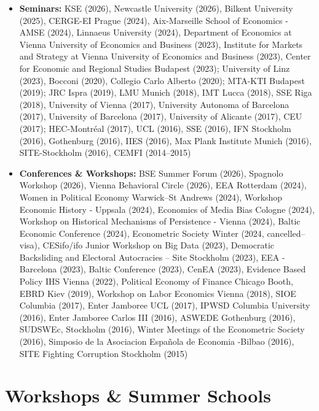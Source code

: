\documentclass[10pt, a4paper]{article}
\begin{document}
\begin{itemize}
\item \textbf{Seminars:} KSE (2026), Newcastle University (2026), Bilkent  University  (2025), CERGE-EI Prague (2024), Aix-Marseille School of Economics - AMSE (2024), Linnaeus University (2024), Department of Economics at Vienna University of Economics and Business  (2023), Institute
for Markets and Strategy at Vienna University of Economics and Business  (2023), Center
for Economic and Regional Studies Budapest  (2023); University of Linz (2023), Bocconi (2020), Collegio Carlo Alberto (2020); MTA-KTI Budapest (2019); JRC Ispra (2019), LMU Munich (2018), IMT Lucca (2018), SSE Riga (2018), University of Vienna (2017), University Autonoma of Barcelona (2017), University of Barcelona (2017),  University of Alicante (2017), CEU (2017); HEC-Montr\'eal (2017), UCL (2016),  SSE (2016),  IFN Stockholm (2016),  Gothenburg (2016),  IIES (2016),  Max Plank Institute Munich (2016), SITE-Stockholm (2016), CEMFI (2014–2015)

\item \textbf{Conferences \& Workshops:} BSE Summer Forum (2026),  Spagnolo Workshop (2026), Vienna Behavioral Circle (2026), EEA Rotterdam (2024), Women in Political Economy Warwick–St Andrews  (2024), Workshop Economic History - Uppsala  (2024), Economics of Media Bias Cologne  (2024),  Workshop on Historical Mechanisms of Persistence - Vienna (2024),  Baltic Economic Conference (2024), Econometric Society Winter (2024, cancelled–visa), CESifo/ifo Junior Workshop on Big Data (2023), Democratic Backsliding and Electoral Autocracies -- Site Stockholm (2023), EEA - Barcelona (2023), Baltic Conference (2023), CenEA (2023), Evidence Based Policy IHS Vienna (2022), Political Economy of Finance Chicago Booth, EBRD Kiev (2019), Workshop on Labor Economics Vienna (2018), SIOE Columbia (2017), Enter Jamboree UCL (2017), IPWSD Columbia University (2016), Enter Jamboree Carlos III  (2016), ASWEDE Gothenburg (2016), SUDSWEc, Stockholm (2016), Winter Meetings of the Econometric Society  (2016), Simposio de la Asociacion Espa\~{n}ola de Economia -Bilbao (2016), SITE Fighting Corruption Stockholm (2015)
\end{itemize}

\section{Workshops \& Summer Schools }
\end{document}
